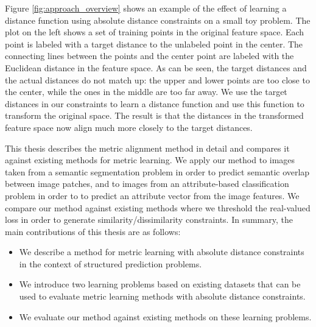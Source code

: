 Figure \ref{fig:approach_overview} shows an example of the effect of learning a distance function using absolute distance constraints on a small toy problem. The plot on the left shows a set of training points in the original feature space. Each point is labeled with a target distance to the unlabeled point in the center. The connecting lines between the points and the center point are labeled with the Euclidean distance in the feature space. As can be seen, the target distances and the actual distances do not match up: the upper and lower points are too close to the center, while the ones in the middle are too far away. We use the target distances in our constraints to learn a distance function and use this function to transform the original space. The result is that the distances in the transformed feature space now align much more closely to the target distances.

This thesis describes the metric alignment method in detail and compares it against existing methods for metric learning. We apply our method to images taken from a semantic segmentation problem in order to predict semantic overlap between image patches, and to images from an attribute-based classification problem in order to to predict an attribute vector from the image features. We compare our method against existing methods where we threshold the real-valued loss in order to generate similarity/dissimilarity constraints. In summary, the main contributions of this thesis are as follows:
\begin{itemize}
\item We describe a method for metric learning with absolute distance constraints in the context of structured prediction problems.
\item We introduce two learning problems based on existing datasets that can be used to evaluate metric learning methods with absolute distance constraints.
\item We evaluate our method against existing methods on these learning problems.
\end{itemize}
